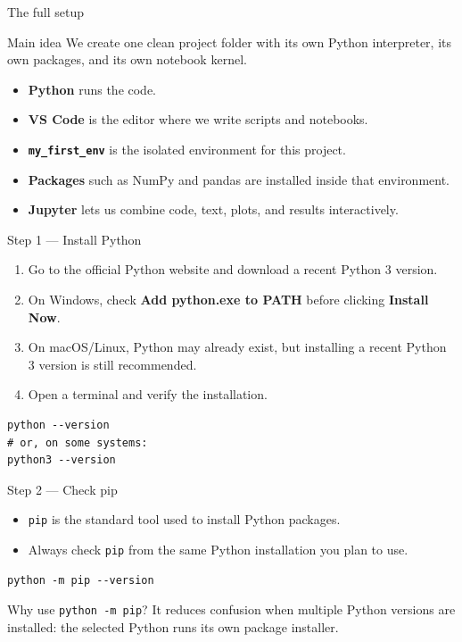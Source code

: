 \documentclass[aspectratio=169]{beamer}
\newcommand{\coursefooter}{}
\begin{document}
\begin{frame}{The full setup}
\begin{block}{Main idea}
We create one clean project folder with its own Python interpreter, its own packages, and its own notebook kernel.
\end{block}
\vspace{0.4em}
\begin{itemize}
\item \textbf{Python} runs the code.
\item \textbf{VS Code} is the editor where we write scripts and notebooks.
\item \textbf{\texttt{my\_first\_env}} is the isolated environment for this project.
\item \textbf{Packages} such as NumPy and pandas are installed inside that environment.
\item \textbf{Jupyter} lets us combine code, text, plots, and results interactively.
\end{itemize}
\coursefooter
\end{frame}

\begin{frame}[fragile]{Step 1 --- Install Python}
\begin{enumerate}
\item Go to the official Python website and download a recent Python 3 version.
\item On Windows, check \textbf{Add python.exe to PATH} before clicking \textbf{Install Now}.
\item On macOS/Linux, Python may already exist, but installing a recent Python 3 version is still recommended.
\item Open a terminal and verify the installation.
\end{enumerate}
\begin{lstlisting}[style=coursebash]
python --version
# or, on some systems:
python3 --version
\end{lstlisting}
\coursefooter
\end{frame}

\begin{frame}[fragile]{Step 2 --- Check pip}
\begin{itemize}
\item \texttt{pip} is the standard tool used to install Python packages.
\item Always check \texttt{pip} from the same Python installation you plan to use.
\end{itemize}
\begin{lstlisting}[style=coursebash]
python -m pip --version
\end{lstlisting}
\begin{block}{Why use \texttt{python -m pip}?}
It reduces confusion when multiple Python versions are installed: the selected Python runs its own package installer.
\end{block}
\coursefooter
\end{frame}
\end{document}
